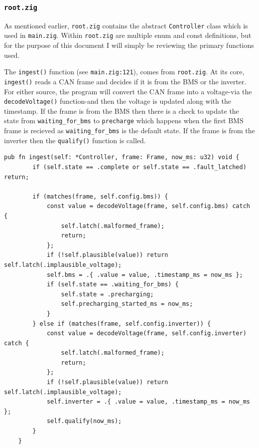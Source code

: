 \documentclass{article}
\begin{document}
\subsubsection{\texttt{root.zig}}
As mentioned earlier, \texttt{root.zig} contains the abstract \texttt{Controller} class which is used in \texttt{main.zig}. Within \texttt{root.zig} are multiple enum and const definitions, but for the purpose of this document I will simply be reviewing the primary functions used.


The \texttt{ingest()} function (see \texttt{main.zig:121}), comes from \texttt{root.zig}. At its core, \texttt{ingest()} reads a CAN frame and decides if it is from the BMS or the inverter. For either source, the program will convert the CAN frame into a voltage-via the \texttt{decodeVoltage()} function-and then the voltage is updated along with the timestamp. If the frame is from the BMS then there is a check to update the state from \texttt{waiting\_for\_bms} to \texttt{precharge} which happens when the first BMS frame is recieved as \texttt{waiting\_for\_bms} is the default state. If the frame is from the inverter then the \texttt{qualify()} function is called.
\begin{lstlisting}[language=Zig, backgroundcolor=\color{codebg}, firstnumber=107]
    pub fn ingest(self: *Controller, frame: Frame, now_ms: u32) void {
        if (self.state == .complete or self.state == .fault_latched) return;

        if (matches(frame, self.config.bms)) {
            const value = decodeVoltage(frame, self.config.bms) catch {
                self.latch(.malformed_frame);
                return;
            };
            if (!self.plausible(value)) return self.latch(.implausible_voltage);
            self.bms = .{ .value = value, .timestamp_ms = now_ms };
            if (self.state == .waiting_for_bms) {
                self.state = .precharging;
                self.precharging_started_ms = now_ms;
            }
        } else if (matches(frame, self.config.inverter)) {
            const value = decodeVoltage(frame, self.config.inverter) catch {
                self.latch(.malformed_frame);
                return;
            };
            if (!self.plausible(value)) return self.latch(.implausible_voltage);
            self.inverter = .{ .value = value, .timestamp_ms = now_ms };
            self.qualify(now_ms);
        }
    }
\end{lstlisting}
\end{document}
